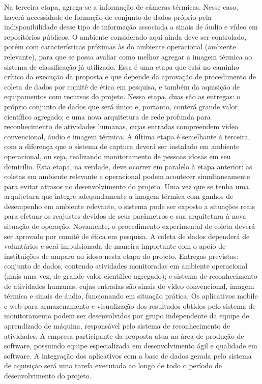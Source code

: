 Na terceira etapa, agrega-se a informação de câmeras térmicas. Nesse caso, haverá necessidade de formação de conjunto de dados próprio pela indisponibilidade desse tipo de informação associada a sinais de áudio e vídeo em repositórios públicos. O ambiente considerado aqui ainda deve ser controlado, porém com características próximas às do ambiente operacional (ambiente relevante), para que se possa avaliar como melhor agregar a imagem térmica ao sistema de classificação já utilizado. Essa é uma etapa que está no caminho crítico da execução da proposta e que depende da aprovação de procedimento de coleta de dados por comitê de ética em pesquisa, e também da aquisição de equipamentos com recursos do projeto. Nessa etapa, duas são as entregas: o próprio conjunto de dados que será único e, portanto, conterá grande valor científico agregado; e uma nova arquitetura de rede profunda para reconhecimento de atividades humanas, cujas entradas compreendem vídeo convencional, áudio e imagem térmica.
A última etapa é semelhante à terceira, com a diferença que o sistema de captura deverá ser instalado em ambiente operacional, ou seja, realizando monitoramento de pessoas idosas em seu domicílio. Esta etapa, na verdade, deve ocorrer em paralelo à etapa anterior: as coletas em ambiente relevante e operacional podem acontecer simultaneamente para evitar atrasos no desenvolvimento do projeto. Uma vez que se tenha uma arquitetura que integre adequadamente a imagem térmica com ganhos de desempenho em ambiente relevante, o sistema pode ser exposto a situações reais para efetuar os reajustes devidos de seus parâmetros e sua arquitetura à nova situação de operação. Novamente, o procedimento experimental de coleta deverá ser aprovado por comitê de ética em pesquisa. A coleta de dados dependerá de voluntários e será impulsionada de maneira importante com o apoio de instituições de amparo ao idoso nesta etapa do projeto. Entregas previstas: conjunto de dados, contendo atividades monitoradas em ambiente operacional (mais uma vez, de grande valor científico agregado); e sistema de reconhecimento de atividades humanas, cujas entradas são sinais de vídeo convencional, imagem térmica e sinais de áudio, funcionando em situação prática. 
Os aplicativos mobile e web para armazenamento e visualização dos resultados obtidos pelo sistema de monitoramento podem ser desenvolvidos por grupo independente da equipe de aprendizado de máquina, responsável pelo sistema de reconhecimento de atividades. A empresa participante da proposta atua na área de produção de software, possuindo equipe especializada em desenvolvimento ágil e qualidade em software. A integração dos aplicativos com a base de dados gerada pelo sistema de aquisição será uma tarefa executada ao longo de todo o período de desenvolvimento do projeto.

